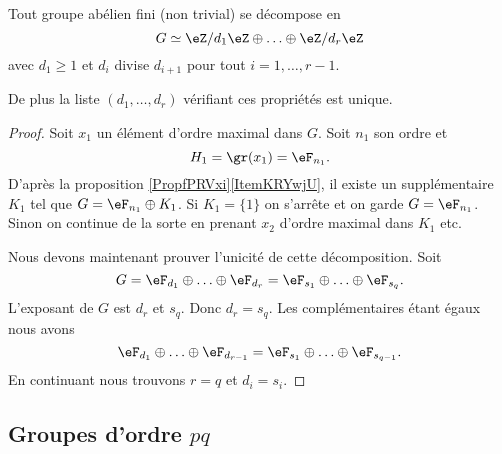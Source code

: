 \begin{theorem} \label{ThoRJWVJd}
    Tout groupe abélien fini (non trivial) se décompose en
    \begin{equation}
        G\simeq \eZ/d_1\eZ\oplus\ldots\oplus \eZ/d_r\eZ
    \end{equation}
    avec \( d_1\geq 1\) et \( d_i\) divise \( d_{i+1}\) pour tout \( i=1,\ldots, r-1\).

    De plus la liste \( (d_1,\ldots, d_r)\) vérifiant ces propriétés est unique.
\end{theorem}

\begin{proof}
    Soit \( x_1\) un élément d'ordre maximal dans \( G\). Soit \( n_1\) son ordre et
    \begin{equation}
        H_1=\gr(x_1)=\eF_{n_1}.
    \end{equation}
    D'après la proposition \ref{PropfPRVxi}\ref{ItemKRYwjU}, il existe un supplémentaire \( K_1\) tel que \( G=\eF_{n_1}\oplus K_1\). Si \( K_1=\{ 1 \}\) on s'arrête et on garde \( G=\eF_{n_1}\). Sinon on continue de la sorte en prenant \( x_2\) d'ordre maximal dans \( K_1\) etc.

    Nous devons maintenant prouver l'unicité de cette décomposition. Soit
    \begin{equation}
        G=\eF_{d_1}\oplus\ldots\oplus \eF_{d_r}=\eF_{s_1}\oplus\ldots\oplus \eF_{s_q}.
    \end{equation}
    L'exposant de \( G\) est \( d_r\) et \( s_q\). Donc \( d_r=s_q\). Les complémentaires étant égaux nous avons
    \begin{equation}
        \eF_{d_1}\oplus\ldots\oplus \eF_{d_{r-1}}=\eF_{s_1}\oplus\ldots\oplus \eF_{s_{q-1}}.
    \end{equation}
    En continuant nous trouvons \( r=q\) et \( d_i=s_i\).
\end{proof}
 
\subsection{Groupes d'ordre \texorpdfstring{$ pq$}{pq}}

